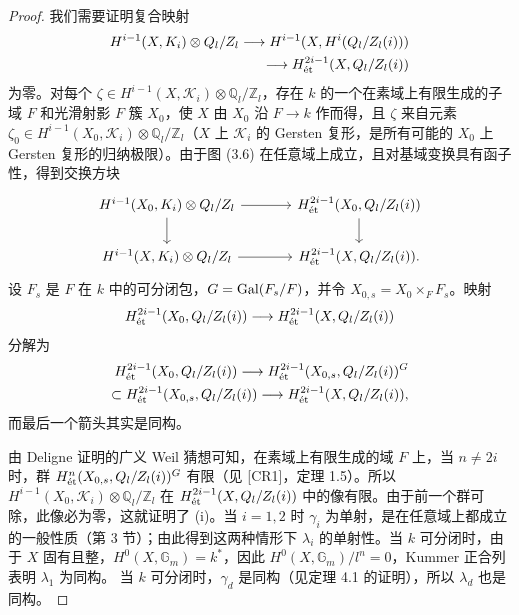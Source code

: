\begin{proof}
我们需要证明复合映射
\[
\begin{split}
H^{i-1}(X,K_i)\otimes Q_l/Z_l\longrightarrow H^{i-1}(X,H^i(Q_l/Z_l(i)))\\
\longrightarrow H^{2i-1}_{\mathrm{\acute et}}(X,Q_l/Z_l(i))
\end{split}
\]
为零。对每个 $\zeta\in H^{i-1}(X,\mathcal K_i)\otimes\mathbb Q_l/\mathbb Z_l$，存在 $k$ 的一个在素域上有限生成的子域 $F$ 和光滑射影 $F$ 簇 $X_0$，使 $X$ 由 $X_0$ 沿 $F\longrightarrow k$ 作而得，且 $\zeta$ 来自元素 $\zeta_0\in H^{i-1}(X_0,\mathcal K_i)\otimes\mathbb Q_l/\mathbb Z_l$（$X$ 上 $\mathcal K_i$ 的 Gersten 复形，是所有可能的 $X_0$ 上 Gersten 复形的归纳极限）。由于图 (3.6) 在任意域上成立，且对基域变换具有函子性，得到交换方块
\[
\begin{tikzcd}[ampersand replacement=\&,column sep=large]
H^{i-1}(X_0,\mathcal K_i)\otimes\mathbb Q_l/\mathbb Z_l \arrow[r] \arrow[d] \& H^{2i-1}_{\et}(X_0,\mathbb Q_l/\mathbb Z_l(i)) \arrow[d]\\
H^{i-1}(X,\mathcal K_i)\otimes\mathbb Q_l/\mathbb Z_l \arrow[r] \& H^{2i-1}_{\et}(X,\mathbb Q_l/\mathbb Z_l(i)).
\end{tikzcd}
\]
设 $F_s$ 是 $F$ 在 $k$ 中的可分闭包，$G=\operatorname{Gal}(F_s/F)$，并令 $X_{0,s}=X_0\times_FF_s$。映射
\[
H^{2i-1}_{\mathrm{\acute et}}(X_0,Q_l/Z_l(i))\longrightarrow H^{2i-1}_{\mathrm{\acute et}}(X,Q_l/Z_l(i))
\]
分解为
\[
\begin{split}
H^{2i-1}_{\mathrm{\acute et}}(X_0,Q_l/Z_l(i))\longrightarrow H^{2i-1}_{\mathrm{\acute et}}(X_{0,s},Q_l/Z_l(i))^G\\
\subset H^{2i-1}_{\mathrm{\acute et}}(X_{0,s},Q_l/Z_l(i))\longrightarrow H^{2i-1}_{\mathrm{\acute et}}(X,Q_l/Z_l(i)),
\end{split}
\]
而最后一个箭头其实是同构。

由 Deligne 证明的广义 Weil 猜想可知，在素域上有限生成的域 $F$ 上，当 $n\ne2i$ 时，群 $H^n_{\mathrm{\acute et}}(X_{0,s},Q_l/Z_l(i))^G$ 有限（见 [CR1]，定理 1.5）。所以 $H^{i-1}(X_0,\mathcal K_i)\otimes\mathbb Q_l/\mathbb Z_l$ 在 $H^{2i-1}_{\mathrm{\acute et}}(X,Q_l/Z_l(i))$ 中的像有限。由于前一个群可除，此像必为零，这就证明了 (i)。当 $i=1,2$ 时 $\gamma_i$ 为单射，是在任意域上都成立的一般性质（第 3 节）；由此得到这两种情形下 $\lambda_i$ 的单射性。当 $k$ 可分闭时，由于 $X$ 固有且整，$H^0(X,\mathbb G_m)=k^*$，因此 $H^0(X,\mathbb G_m)/l^n=0$，Kummer 正合列表明 $\lambda_1$ 为同构。
当 $k$ 可分闭时，$\gamma_d$ 是同构（见定理 4.1 的证明），所以 $\lambda_d$ 也是同构。
\end{proof}
